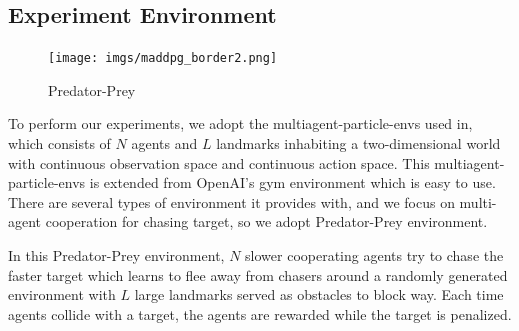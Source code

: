 \documentclass[11pt,twocolumn]{jarticle} %
\begin{document}
\subsection{Experiment Environment}

\begin{figure}[h]
 \begin{center}
  \texttt{[image: imgs/maddpg\_border2.png]}
  \caption{Predator-Prey}
  \label{fig:predator_prey}
 \end{center}
\end{figure}

To perform our experiments, we adopt the multiagent-particle-envs used in\cite{maddpg}, which consists of $N$ agents and $L$ landmarks inhabiting a two-dimensional world with continuous observation space and continuous action space. This multiagent-particle-envs is extended from OpenAI's gym\cite{gym} environment which is easy to use. There are several types of environment it provides with, and we focus on multi-agent cooperation for chasing target, so we adopt Predator-Prey environment. \par

In this Predator-Prey environment, $N$ slower cooperating agents try to chase the faster target which learns to flee away from chasers around a randomly generated environment with $L$ large landmarks served as obstacles to block way. Each time agents collide with a target, the agents are rewarded while the target is penalized. \par
\end{document}
